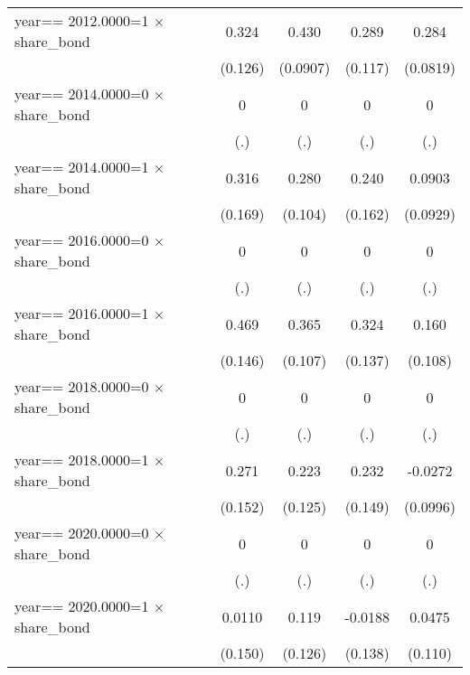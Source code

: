 \begin{table}[htbp]
\begin{tabular}{l*{4}{c}}
year==  2012.0000=1 $\times$ share\_bond&    0.324\sym{**} &    0.430\sym{***}&    0.289\sym{**} &    0.284\sym{***}\\
                &  (0.126)         & (0.0907)         &  (0.117)         & (0.0819)         \\
year==  2014.0000=0 $\times$ share\_bond&        0         &        0         &        0         &        0         \\
                &      (.)         &      (.)         &      (.)         &      (.)         \\
year==  2014.0000=1 $\times$ share\_bond&    0.316\sym{*}  &    0.280\sym{***}&    0.240         &   0.0903         \\
                &  (0.169)         &  (0.104)         &  (0.162)         & (0.0929)         \\
year==  2016.0000=0 $\times$ share\_bond&        0         &        0         &        0         &        0         \\
                &      (.)         &      (.)         &      (.)         &      (.)         \\
year==  2016.0000=1 $\times$ share\_bond&    0.469\sym{***}&    0.365\sym{***}&    0.324\sym{**} &    0.160         \\
                &  (0.146)         &  (0.107)         &  (0.137)         &  (0.108)         \\
year==  2018.0000=0 $\times$ share\_bond&        0         &        0         &        0         &        0         \\
                &      (.)         &      (.)         &      (.)         &      (.)         \\
year==  2018.0000=1 $\times$ share\_bond&    0.271\sym{*}  &    0.223\sym{*}  &    0.232         &  -0.0272         \\
                &  (0.152)         &  (0.125)         &  (0.149)         & (0.0996)         \\
year==  2020.0000=0 $\times$ share\_bond&        0         &        0         &        0         &        0         \\
                &      (.)         &      (.)         &      (.)         &      (.)         \\
year==  2020.0000=1 $\times$ share\_bond&   0.0110         &    0.119         &  -0.0188         &   0.0475         \\
                &  (0.150)         &  (0.126)         &  (0.138)         &  (0.110)         \\

\end{tabular}
\end{table}
